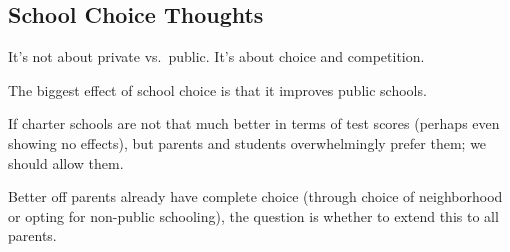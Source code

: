 \subsection{School Choice Thoughts}

\thought It's not about private vs.\ public. It's about choice and competition.

\thought The biggest effect of school choice is that it improves public schools.

\thought If charter schools are not that much better in terms of test scores
(perhaps even showing no effects), but parents and students overwhelmingly
prefer them; we should allow them.

\thought Better off parents already have complete choice (through choice of
neighborhood or opting for non-public schooling), the question is whether to
extend this to all parents.

